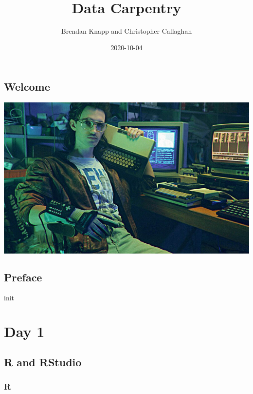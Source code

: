 \documentclass[
]{report}
\title{Data Carpentry}
\author{Brendan Knapp and Christopher Callaghan}
\date{2020-10-04}
\begin{document}
\maketitle

{
\setcounter{tocdepth}{4}
\tableofcontents
}
\hypertarget{welcome}{%
\chapter*{Welcome}\label{welcome}}

\begin{center}\includegraphics[width=1\linewidth]{images/hackerman} \end{center}

\hypertarget{preface}{%
\chapter*{Preface}\label{preface}}

init

\cleardoublepage

\hypertarget{part-day-1}{%
\part{Day 1}\label{part-day-1}}

\hypertarget{setup-r-and-rstudio}{%
\chapter{R and RStudio}\label{setup-r-and-rstudio}}

\hypertarget{r}{%
\section{R}\label{r}}
\end{document}
